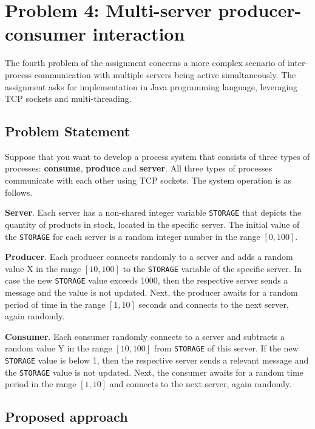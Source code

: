 \documentclass[acmlarge]{acmart}
\newcommand{\storage}{{\small \texttt{STORAGE}} }
\begin{document}
\section{Problem 4: Multi-server producer-consumer interaction}
\label{sec:problem4}
The fourth problem of the assignment concerns a more complex scenario of inter-process communication with multiple servers being active simultaneously. The assignment asks for implementation in Java programming language, leveraging TCP sockets and multi-threading.
\subsection{Problem Statement}\label{subsec:problem-statement}
Suppose that you want to develop a process system that consists of three types of processes: \textbf{consume}, \textbf{produce} and \textbf{server}. All three types of processes communicate with each other using TCP sockets. The system operation is as follows.

\textbf{Server}. Each server has a non-shared integer variable \storage that depicts the quantity of products in stock, located in the specific server. The initial value of the \storage for each server is a random integer number in the range $[0, 100]$.

\textbf{Producer}. Each producer connects randomly to a server and adds a random value X in the range $[10, 100]$ to the \storage variable of the specific server. In case the new \storage value exceeds 1000, then the respective server sends a message and the value is not updated. Next, the producer awaits for a random period of time in the range $[1, 10]$ seconds and connects to the next server, again randomly.

\textbf{Consumer}. Each consumer randomly connects to a server and subtracts a random value Y in the range $[10, 100]$ from \storage of this server. If the new \storage value is below 1, then the respective server sends a relevant message and the \storage value is not updated. Next, the consumer awaits for a random time period in the range $[1, 10]$ and connects to the next server, again randomly.


\subsection{Proposed approach}\label{subsec:proposed-approach}
\end{document}
